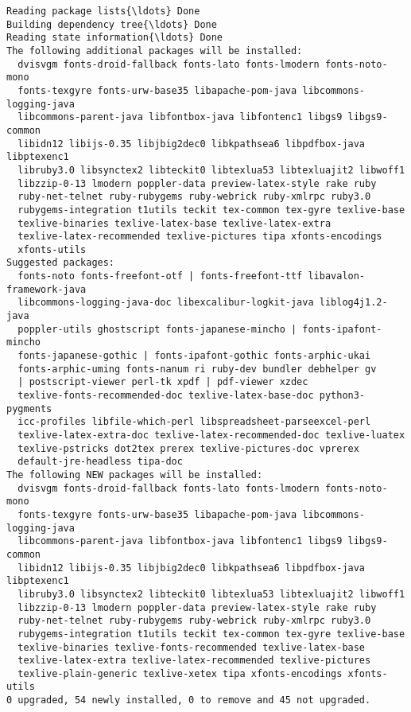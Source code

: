 \documentclass[11pt]{article}
\begin{document}
    \begin{Verbatim}[commandchars=\\\{\}]
Reading package lists{\ldots} Done
Building dependency tree{\ldots} Done
Reading state information{\ldots} Done
The following additional packages will be installed:
  dvisvgm fonts-droid-fallback fonts-lato fonts-lmodern fonts-noto-mono
  fonts-texgyre fonts-urw-base35 libapache-pom-java libcommons-logging-java
  libcommons-parent-java libfontbox-java libfontenc1 libgs9 libgs9-common
  libidn12 libijs-0.35 libjbig2dec0 libkpathsea6 libpdfbox-java libptexenc1
  libruby3.0 libsynctex2 libteckit0 libtexlua53 libtexluajit2 libwoff1
  libzzip-0-13 lmodern poppler-data preview-latex-style rake ruby
  ruby-net-telnet ruby-rubygems ruby-webrick ruby-xmlrpc ruby3.0
  rubygems-integration t1utils teckit tex-common tex-gyre texlive-base
  texlive-binaries texlive-latex-base texlive-latex-extra
  texlive-latex-recommended texlive-pictures tipa xfonts-encodings
  xfonts-utils
Suggested packages:
  fonts-noto fonts-freefont-otf | fonts-freefont-ttf libavalon-framework-java
  libcommons-logging-java-doc libexcalibur-logkit-java liblog4j1.2-java
  poppler-utils ghostscript fonts-japanese-mincho | fonts-ipafont-mincho
  fonts-japanese-gothic | fonts-ipafont-gothic fonts-arphic-ukai
  fonts-arphic-uming fonts-nanum ri ruby-dev bundler debhelper gv
  | postscript-viewer perl-tk xpdf | pdf-viewer xzdec
  texlive-fonts-recommended-doc texlive-latex-base-doc python3-pygments
  icc-profiles libfile-which-perl libspreadsheet-parseexcel-perl
  texlive-latex-extra-doc texlive-latex-recommended-doc texlive-luatex
  texlive-pstricks dot2tex prerex texlive-pictures-doc vprerex
  default-jre-headless tipa-doc
The following NEW packages will be installed:
  dvisvgm fonts-droid-fallback fonts-lato fonts-lmodern fonts-noto-mono
  fonts-texgyre fonts-urw-base35 libapache-pom-java libcommons-logging-java
  libcommons-parent-java libfontbox-java libfontenc1 libgs9 libgs9-common
  libidn12 libijs-0.35 libjbig2dec0 libkpathsea6 libpdfbox-java libptexenc1
  libruby3.0 libsynctex2 libteckit0 libtexlua53 libtexluajit2 libwoff1
  libzzip-0-13 lmodern poppler-data preview-latex-style rake ruby
  ruby-net-telnet ruby-rubygems ruby-webrick ruby-xmlrpc ruby3.0
  rubygems-integration t1utils teckit tex-common tex-gyre texlive-base
  texlive-binaries texlive-fonts-recommended texlive-latex-base
  texlive-latex-extra texlive-latex-recommended texlive-pictures
  texlive-plain-generic texlive-xetex tipa xfonts-encodings xfonts-utils
0 upgraded, 54 newly installed, 0 to remove and 45 not upgraded.

\end{Verbatim}
\end{document}
